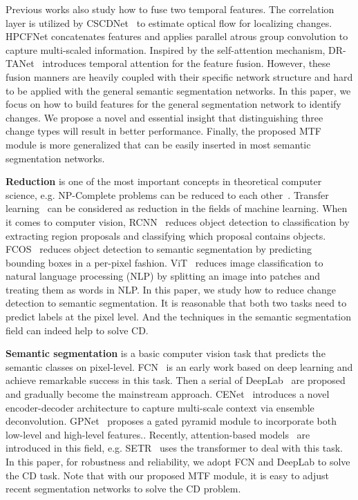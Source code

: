\documentclass[review]{elsarticle}
\begin{document}
Previous works also study how to fuse two temporal features. The correlation layer is utilized by CSCDNet~\cite{CSCDNet} to estimate optical flow for localizing changes. HPCFNet \cite{HPCFNet} concatenates features and applies parallel atrous group convolution to capture multi-scaled information. Inspired by the self-attention mechanism, DR-TANet~\cite{DR_TANet} introduces temporal attention for the feature fusion. However, these fusion manners are heavily coupled with their specific network structure and hard to be applied with the general semantic segmentation networks. In this paper, we focus on how to build features for the general segmentation network to identify changes. We propose a novel and essential insight that distinguishing three change types will result in better performance. Finally, the proposed MTF module is more generalized that can be easily inserted in most semantic segmentation networks.

\textbf{Reduction} is one of the most important concepts in theoretical computer science, e.g. NP-Complete problems can be reduced to each other~\cite{Karp_Reducibility}. Transfer learning~\cite{transfer} can be considered as reduction in the fields of machine learning. When it comes to computer vision, RCNN~\cite{RCNN} reduces object detection to classification by extracting region proposals and classifying which proposal contains objects. FCOS~\cite{fcos} reduces object detection to semantic segmentation by predicting bounding boxes in a per-pixel fashion. ViT~\cite{ViT} reduces image classification to natural language processing (NLP) by splitting an image into patches and treating them as words in NLP. In this paper, we study how to reduce change detection to semantic segmentation. It is reasonable that both two tasks need to predict labels at the pixel level. And the techniques in the semantic segmentation field can indeed help to solve CD.

\textbf{Semantic segmentation} is a basic computer vision task that predicts the semantic classes on pixel-level. FCN~\cite{FCN} is an early work based on deep learning and achieve remarkable success in this task. Then a serial of DeepLab~\cite{ASPP,deeplabv3} are proposed and gradually become the mainstream approach. CENet~\cite{zhou2022contextual} introduces a novel encoder-decoder architecture to capture multi-scale context via ensemble deconvolution. GPNet~\cite{zhang2021gpnet} proposes a gated pyramid module to incorporate both low-level and high-level features.. Recently, attention-based models~\cite{DANet,ccnet} are introduced in this field, e.g. SETR~\cite{SETR} uses the transformer to deal with this task. In this paper, for robustness and reliability, we adopt FCN and DeepLab to solve the CD task. Note that with our proposed MTF module, it is easy to adjust recent segmentation networks to solve the CD problem.
\end{document}
